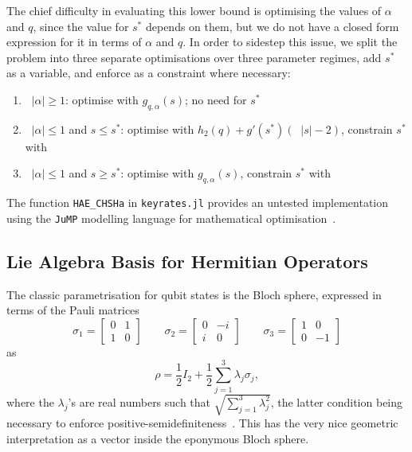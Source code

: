 \documentclass[10pt, a4paper]{article}
\numberwithin{equation}{section} %
\theoremstyle{definition}
\theoremstyle{plain}
\newcommand{\abs}[1]{\mathop{}\left\lvert#1\right\rvert}
\newcommand{\?}{\mathrel{?}} %
\begin{document}
\begin{appendices}
                    The chief difficulty in evaluating this lower bound is optimising the values of \(\alpha\) and \(q\), since the value for \(s^*\) depends on them, but we do not have a closed form expression for it in terms of \(\alpha\) and \(q\). In order to sidestep this issue, we split the problem into three separate optimisations over three parameter regimes, add \(s^*\) as a variable, and enforce  as a constraint where necessary:
                    \begin{enumerate}
                      \item \(\abs{\alpha} \geq 1\): optimise with \(g_{q,\alpha}(s)\); no need for \(s^*\)
                      \item \(\abs{\alpha} \leq 1\) and \(s \leq s^*\): optimise with \(h_2(q) + g'(s^*)(\abs{s}-2)\), constrain \(s^*\) with 
                      \item \(\abs{\alpha} \leq 1\) and \(s \geq s^*\): optimise with \(g_{q,\alpha}(s)\), constrain \(s^*\) with 
                    \end{enumerate}

                    The function \verb`HAE_CHSHa` in \verb`keyrates.jl` provides an untested implementation using the \verb`JuMP` modelling language for mathematical optimisation~\cite{JuMP}.

                    \subsection{Lie Algebra Basis for Hermitian Operators}\label{sec:addtech_liealg}

                    The classic parametrisation for qubit states is the Bloch sphere, expressed in terms of the Pauli matrices
                    \begin{equation}
                      \sigma_1 = \begin{bmatrix} 0 & 1 \\ 1 &  0 \end{bmatrix} \qquad \sigma_2 = \begin{bmatrix} 0 & -i \\ i & 0 \end{bmatrix} \qquad \sigma_3 = \begin{bmatrix} 1 & 0 \\ 0 & -1 \end{bmatrix}
                    \end{equation}
                    as
                    \begin{equation}
                      \rho = \frac{1}{2}I_2 + \frac{1}{2} \sum_{j=1}^3 \lambda_j \sigma_j,
                    \end{equation}
                    where the \(\lambda_j\)'s are real numbers such that \(\sqrt{\sum_{j=1}^3 \lambda_j^2}\), the latter condition being necessary to enforce positive-semidefiniteness~\cite{DensMatParam}. This has the very nice geometric interpretation as a vector inside the eponymous Bloch sphere.


\end{appendices}
\end{document}
